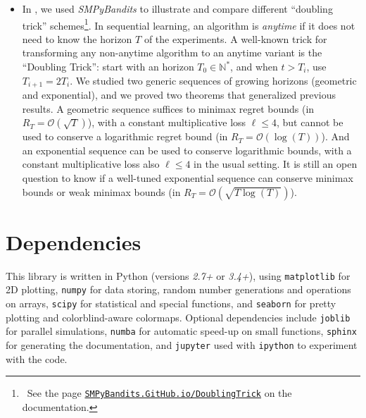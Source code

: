 \documentclass[a4paper,10pt,]{article}
\providecommand{\tightlist}{%
  \setlength{\itemsep}{0pt}\setlength{\parskip}{0pt}}
\begin{document}
\begin{itemize}
\tightlist
\item
  In \citet{Besson2018c}, we used \emph{SMPyBandits} to illustrate and
  compare different ``doubling trick'' schemes\footnote{~See the
    page
    \href{https://SMPyBandits.GitHub.io/DoublingTrick.html}{\texttt{SMPyBandits.GitHub.io/DoublingTrick}}
    on the documentation.}. In sequential learning, an algorithm is
  \emph{anytime} if it does not need to know the horizon \(T\) of the
  experiments. A well-known trick for transforming any non-anytime
  algorithm to an anytime variant is the ``Doubling Trick'': start with
  an horizon \(T_0\in\mathbb{N}^*\), and when \(t > T_i\), use
  \(T_{i+1} = 2 T_i\). We studied two generic sequences of growing
  horizons (geometric and exponential), and we proved two theorems that
  generalized previous results. A geometric sequence suffices to minimax
  regret bounds (in \(R_T = \mathcal{O}(\sqrt{T})\)), with a constant
  multiplicative loss \(\ell \leq 4\), but cannot be used to conserve a
  logarithmic regret bound (in \(R_T = \mathcal{O}(\log(T))\)). And an
  exponential sequence can be used to conserve logarithmic bounds, with
  a constant multiplicative loss also \(\ell \leq 4\) in the usual
  setting. It is still an open question to know if a well-tuned
  exponential sequence can conserve minimax bounds or weak minimax
  bounds (in \(R_T = \mathcal{O}(\sqrt{T \log(T)})\)).
\end{itemize}

\section{Dependencies}\label{dependencies}

This library is written in Python \citep{python} (versions \emph{2.7+} or \emph{3.4+}),
using \texttt{matplotlib} \citep{matplotlib} for 2D plotting,
\texttt{numpy} \citep{numpy} for data storing, random number generations
and operations on arrays, \texttt{scipy} \citep{scipy} for
statistical and special functions, and \texttt{seaborn} \citep{seaborn}
for pretty plotting and colorblind-aware colormaps. Optional
dependencies include \texttt{joblib} \citep{joblib} for parallel
simulations, \texttt{numba} \citep{numba} for automatic speed-up on small
functions, \texttt{sphinx} \citep{sphinx} for generating the
documentation, and \texttt{jupyter}
\citep{jupyter} used with \texttt{ipython} \citep{ipython} to experiment
with the code.

\begin{normalsize}
  
\end{normalsize}
\end{document}
